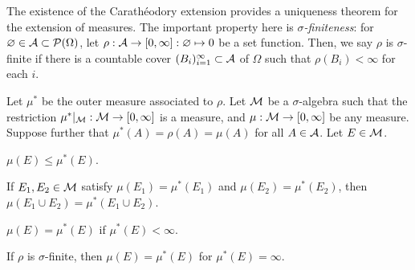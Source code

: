 \documentclass{../note}
\begin{document}
\begin{prb}
The existence of the Carath\'eodory extension provides a uniqueness theorem for the extension of measures.
The important property here is \emph{$\sigma$-finiteness}: for $\varnothing\in\mathcal{A}\subset\mathcal{P}(\Omega)$, let $\rho:\mathcal{A}\to[0,\infty]:\varnothing\mapsto0$ be a set function.
Then, we say $\rho$ is $\sigma$-finite if there is a countable cover $(B_i)_{i=1}^\infty\subset\mathcal{A}$ of $\Omega$ such that $\rho(B_i)<\infty$ for each $i$.

Let $\mu^*$ be the outer measure associated to $\rho$.
Let $\mathcal{M}$ be a $\sigma$-algebra such that the restriction $\mu^*|_{\mathcal{M}}:\mathcal{M}\to[0,\infty]$ is a measure, and $\mu:\mathcal{M}\to[0,\infty]$ be any measure.
Suppose further that $\mu^*(A)=\rho(A)=\mu(A)$ for all $A\in\mathcal{A}$.
Let $E\in\mathcal{M}$.
\begin{parts}
\item $\mu(E)\le\mu^*(E)$.
\item If $E_1,E_2\in\mathcal{M}$ satisfy $\mu(E_1)=\mu^*(E_1)$ and $\mu(E_2)=\mu^*(E_2)$, then $\mu(E_1\cup E_2)=\mu^*(E_1\cup E_2)$.
\item $\mu(E)=\mu^*(E)$ if $\mu^*(E)<\infty$.
\item If $\rho$ is $\sigma$-finite, then $\mu(E)=\mu^*(E)$ for $\mu^*(E)=\infty$.
\end{parts}
\end{prb}
\end{document}
